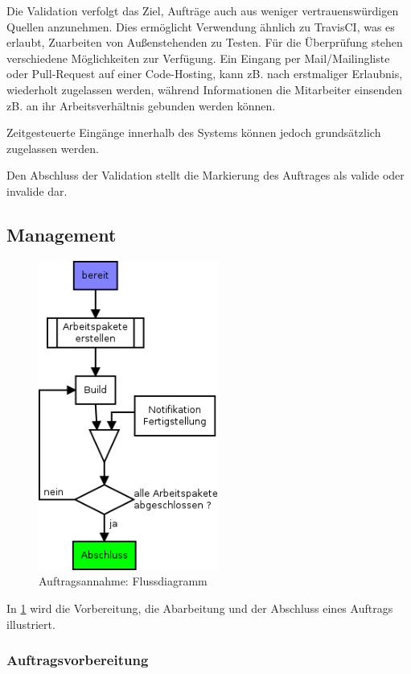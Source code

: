 
Die Validation verfolgt das Ziel, Aufträge auch aus weniger vertrauenswürdigen Quellen anzunehmen.
Dies ermöglicht Verwendung ähnlich zu TravisCI, was es erlaubt, Zuarbeiten von Außenstehenden zu Testen.
Für die Überprüfung stehen verschiedene Möglichkeiten zur Verfügung.
Ein Eingang per Mail/Mailingliste oder Pull-Request auf einer Code-Hosting,
kann zB. nach erstmaliger Erlaubnis, wiederholt zugelassen werden,
während Informationen die Mitarbeiter einsenden zB. an ihr Arbeitsverhältnis gebunden werden können.

Zeitgesteuerte Eingänge innerhalb des Systems können jedoch grundsätzlich zugelassen werden.

Den Abschluss der Validation stellt die Markierung des Auftrages als valide oder invalide dar.

\subsection{Management}

\begin{figure}[ht] 
  \centering
  \includegraphics[height=4in]{imageinput/lebenszyklus-auftrag-abarbeitung.png}
  \caption{Auftragsannahme: Flussdiagramm}
  \label{fig:lebenszyklus-auftrag-abarbeitung}
\end{figure}

In \cref{fig:lebenszyklus-auftrag-abarbeitung} wird die Vorbereitung, die Abarbeitung und der Abschluss eines Auftrags illustriert.


\subsubsection{Auftragsvorbereitung}

